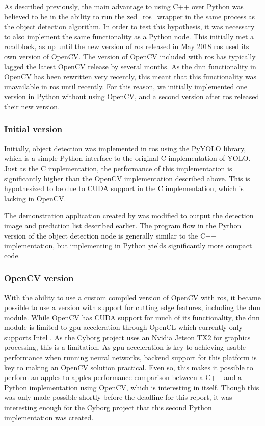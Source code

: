 \documentclass[\rootfolder/main.tex]{subfiles}
\begin{document}
As described previously, the main advantage to using C++ over Python was believed to be in the ability to run the zed\_ros\_wrapper in the same process as the object detection algorithm.
In order to test this hypothesis, it was necessary to also implement the same functionality as a Python node.
This initially met a roadblock, as up until the new version of \acrshort{ros} released in May 2018 \acrshort{ros} used its own version of OpenCV.
The version of OpenCV included with \acrshort{ros} has typically lagged the latest OpenCV release by several months.
As the \acrshort{dnn} functionality in OpenCV has been rewritten very recently, this meant that this functionality was unavailable in \acrshort{ros} until recently.
For this reason, we initially implemented one version in Python without using OpenCV, and a second version after \acrshort{ros} released their new version.

\subsubsection{Initial version}

Initially, object detection was implemented in \acrshort{ros} using the PyYOLO library, which is a simple Python interface to the original C implementation of YOLO.
Just as the C implementation, the performance of this implementation is significantly higher than the OpenCV implementation described above.
This is hypothesized to be due to CUDA support in the C implementation, which is lacking in OpenCV.

The demonstration application created by \cite{Opheim2018} was modified to output the detection image and prediction list described earlier.
The program flow in the Python version of the object detection node is generally similar to the C++ implementation, but implementing in Python yields significantly more compact code.

\subsubsection{OpenCV version}

With the ability to use a custom compiled version of OpenCV with \acrshort{ros}, it became possible to use a version with support for cutting edge features, including the \acrfull{dnn} module.
While OpenCV has CUDA support for much of its functionality, the \acrshort{dnn} module is limited to \acrshort{gpu} acceleration through OpenCL which currently only supports Intel .
As the Cyborg project uses an Nvidia Jetson TX2 for graphics processing, this is a limitation.
As \acrshort{gpu} acceleration is key to achieving usable performance when running neural networks, backend support for this platform is key to making an OpenCV solution practical.
Even so, this makes it possible to perform an apples to apples performance comparison between a C++ and a Python implementation using OpenCV, which is interesting in itself.
Though this was only made possible shortly before the deadline for this report, it was interesting enough for the Cyborg project that this second Python implementation was created.
\end{document}
